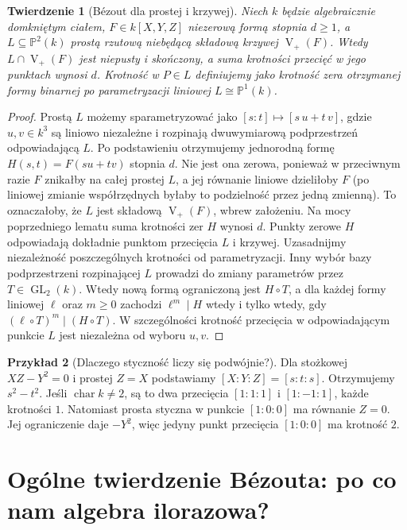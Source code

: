 \documentclass[11pt,a4paper,openany]{report}
\numberwithin{equation}{section}
\theoremstyle{plain}
\newtheorem{twierdzenie}{Twierdzenie}[section]
\theoremstyle{definition}
\newtheorem{przyklad}[twierdzenie]{Przykład}
\theoremstyle{remark}
\newcommand{\PP}{\mathbb P}
\newcommand{\V}{\operatorname V}
\begin{document}
\begin{twierdzenie}[Bézout dla prostej i krzywej]
\label{tw:bezout-line}
Niech $k$ będzie algebraicznie domkniętym ciałem,
$F\in k[X,Y,Z]$ niezerową formą stopnia $d\ge1$,
a $L\subseteq\PP^2(k)$ prostą rzutową niebędącą
składową krzywej $\V_+(F)$. Wtedy $L\cap\V_+(F)$
jest niepusty i skończony, a suma krotności przecięć
w jego punktach wynosi $d$. Krotność w $P\in L$
definiujemy jako krotność zera otrzymanej formy binarnej
po parametryzacji liniowej $L\cong\PP^1(k)$.
\end{twierdzenie}
\begin{proof}
Prostą $L$ możemy sparametryzować jako
$[s:t]\mapsto[s\,u+t\,v]$, gdzie $u,v\in k^3$
są liniowo niezależne i rozpinają dwuwymiarową
podprzestrzeń odpowiadającą $L$. Po podstawieniu
otrzymujemy jednorodną formę $H(s,t)=F(su+tv)$ stopnia $d$.
Nie jest ona zerowa, ponieważ w przeciwnym razie $F$
znikałby na całej prostej $L$, a jej równanie liniowe
dzieliłoby $F$ (po liniowej zmianie współrzędnych
byłaby to podzielność przez jedną zmienną). To oznaczałoby,
że $L$ jest składową $\V_+(F)$, wbrew założeniu.
Na mocy poprzedniego lematu suma krotności zer $H$
wynosi $d$. Punkty zerowe $H$ odpowiadają dokładnie
punktom przecięcia $L$ i krzywej.
Uzasadnijmy niezależność poszczególnych krotności od parametryzacji.
Inny wybór bazy podprzestrzeni rozpinającej $L$ prowadzi do
zmiany parametrów przez $T\in\operatorname{GL}_2(k)$.
Wtedy nową formą ograniczoną jest $H\circ T$,
a dla każdej formy liniowej $\ell$ oraz $m\ge0$
zachodzi $\ell^m\mid H$ wtedy i tylko wtedy, gdy
$(\ell\circ T)^m\mid(H\circ T)$.
W szczególności krotność przecięcia w odpowiadającym
punkcie $L$ jest niezależna od wyboru $u,v$.
\end{proof}

\begin{przyklad}[Dlaczego styczność liczy się podwójnie?]
Dla stożkowej $XZ-Y^2=0$ i prostej $Z=X$ podstawiamy
$[X:Y:Z]=[s:t:s]$. Otrzymujemy $s^2-t^2$.
Jeśli $\operatorname{char}k\ne2$, są to dwa przecięcia
$[1:1:1]$ i $[1:-1:1]$, każde krotności $1$.
Natomiast prosta styczna w punkcie $[1:0:0]$ ma równanie
$Z=0$. Jej ograniczenie daje $-Y^2$, więc jedyny punkt
przecięcia $[1:0:0]$ ma krotność $2$.
\end{przyklad}

\section{Ogólne twierdzenie Bézouta: po co nam algebra ilorazowa?}
\end{document}
